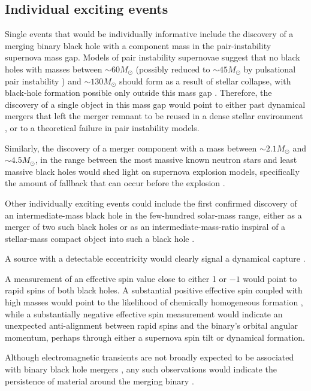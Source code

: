 \documentclass[review]{elsarticle}
\begin{document}
\subsection{Individual exciting events}
Single events that would be individually informative include the discovery of a merging binary black hole with a component mass in the pair-instability supernova mass gap.  Models of pair instability supernovae suggest that no black holes with masses between $\sim 60 M_\odot$ (possibly reduced to $\sim 45 M_\odot$ by pulsational pair instability \citep{Woosley:2017}) and $\sim 130 M_\odot$ should form as a result of stellar collapse, with black-hole formation possible only outside this mass gap \citep{Marchant:2016}.  Therefore, the discovery of a single object in this mass gap would point to either past dynamical mergers that left the merger remnant to be reused in a dense stellar environment \citep{Rodriguez:2018}, or to a theoretical failure in pair instability models. 

Similarly, the discovery of a merger component with a mass between $\sim 2.1 M_\odot$ and $\sim 4.5 M_\odot$, in the range between the most massive known neutron stars and least massive black holes \citep{Ozel:2010,Farr:2011} would shed light on supernova explosion models, specifically the amount of fallback that can occur before the explosion \citep{Fryer:2012}.

Other individually exciting events could include the first confirmed discovery of an intermediate-mass black hole in the few-hundred solar-mass range, either as a merger of two such black holes \citep[e.g.,][]{AmaroSeoaneSantamaria:2009,Veitch:2015,Graff:2015} or as an intermediate-mass-ratio inspiral of a stellar-mass compact object into such a black hole \citep[e.g.,][]{Mandel:2008,Haster:2015IMRI,Haster:2016}. 

A source with a detectable eccentricity would clearly signal a dynamical capture \citep{Breivik:2016}. 

A measurement of an effective spin value close to either 1 or $-1$ would point to rapid spins of both black holes. A substantial positive effective spin coupled with high masses would point to the likelihood of chemically homogeneous formation \citep{Marchant:2016}, while a substantially negative effective spin measurement would indicate an unexpected anti-alignment between rapid spins and the binary's orbital angular momentum, perhaps through either a supernova spin tilt or dynamical formation.  

Although electromagnetic transients are not broadly expected to be associated with binary black hole mergers \citep[e.g.,][]{Lyutikov:2016}, any such observations would indicate the persistence of material around the merging binary \citep[e.g.,][]{deMinkKing:2017}.
\end{document}

